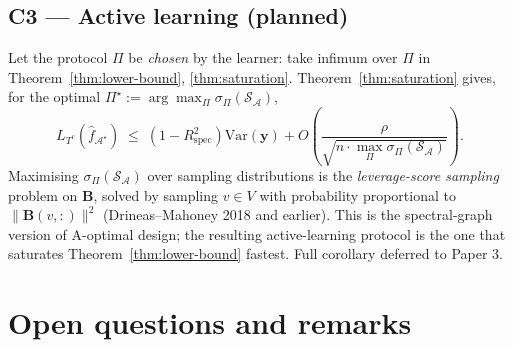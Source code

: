 \documentclass[11pt,a4paper]{article}
\theoremstyle{plain}
\theoremstyle{definition}
\theoremstyle{remark}
\newcommand{\by}{\mathbf{y}}
\newcommand{\bB}{\mathbf{B}}
\newcommand{\Var}{\mathrm{Var}}
\newcommand{\Rspec}{R^2_{\mathrm{spec}}}
\newcommand{\Scal}{\mathcal{S}}
\newcommand{\Acal}{\mathcal{A}}
\begin{document}
\subsection{C3 — Active learning (planned)}
\label{subsec:c3}

Let the protocol $\Pi$ be \emph{chosen} by the learner: take infimum
over $\Pi$ in Theorem~\ref{thm:lower-bound}, \ref{thm:saturation}.
Theorem~\ref{thm:saturation} gives, for the optimal $\Pi^\star :=
\arg\max_\Pi \sigma_\Pi(\Scal_\Acal)$,
\begin{equation}
    L_{T^c}(\hat f_{\Acal^\star})
    \;\leq\; (1-\Rspec)\Var(\by) + O\left(\frac{\rho}{\sqrt{n \cdot \max_\Pi \sigma_\Pi(\Scal_\Acal)}}\right).
\end{equation}
Maximising $\sigma_\Pi(\Scal_\Acal)$ over sampling distributions is the
\emph{leverage-score sampling} problem on $\bB$, solved by sampling
$v \in V$ with probability proportional to $\|\bB(v, :)\|^2$
(Drineas--Mahoney 2018 and earlier).  This is the spectral-graph version
of A-optimal design; the resulting active-learning protocol is the one
that saturates Theorem~\ref{thm:lower-bound} fastest.  Full corollary
deferred to Paper 3.

\section{Open questions and remarks}
\label{sec:open}
\end{document}
